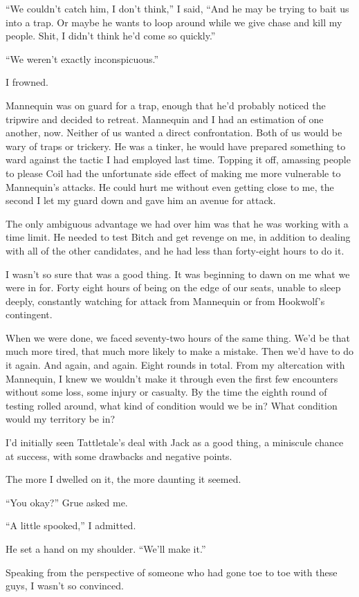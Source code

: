 ``We couldn't catch him, I don't think,'' I said, ``And he may be trying to bait us into a trap.  Or maybe he wants to loop around while we give chase and kill my people.  Shit, I didn't think he'd come so quickly.''



``We weren't exactly inconspicuous.''



I frowned.



Mannequin was on guard for a trap, enough that he'd probably noticed the tripwire and decided to retreat.  Mannequin and I had an estimation of one another, now.  Neither of us wanted a direct confrontation.  Both of us would be wary of traps or trickery.  He was a tinker, he would have prepared something to ward against the tactic I had employed last time.  Topping it off, amassing people to please Coil had the unfortunate side effect of making me more vulnerable to Mannequin's attacks.  He could hurt me without even getting close to me, the second I let my guard down and gave him an avenue for attack.



The only ambiguous advantage we had over him was that he was working with a time limit.  He needed to test Bitch and get revenge on me, in addition to dealing with all of the other candidates, and he had less than forty-eight hours to do it.



I wasn't so sure that was a good thing.  It was beginning to dawn on me what we were in for.  Forty eight hours of being on the edge of our seats, unable to sleep deeply, constantly watching for attack from Mannequin or from Hookwolf's contingent.



When we were done, we faced seventy-two hours of the same thing.  We'd be that much more tired, that much more likely to make a mistake.  Then we'd have to do it again.  And again, and again.  Eight rounds in total.  From my altercation with Mannequin, I knew we wouldn't make it through even the first few encounters without some loss, some injury or casualty.  By the time the eighth round of testing rolled around, what kind of condition would we be in?  What condition would my territory be in?



I'd initially seen Tattletale's deal with Jack as a good thing, a miniscule chance at success, with some drawbacks and negative points.



The more I dwelled on it, the more daunting it seemed.



``You okay?'' Grue asked me.



``A little spooked,'' I admitted.



He set a hand on my shoulder.  ``We'll make it.''



Speaking from the perspective of someone who had gone toe to toe with these guys, I wasn't so convinced.





